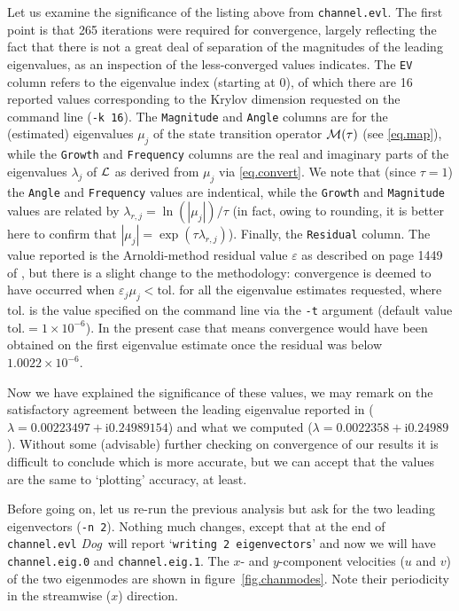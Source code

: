 \documentclass[11pt,a4paper]{report}
\newcommand\ci{\mathrm{i}}
\newcommand\Lop{{\cal L}}
\newcommand\Mop{{\cal M}}
\newcommand{\Dog}{\emph{Dog}}
\begin{document}
Let us examine the significance of the listing above from
\verb+channel.evl+.  The first point is that 265 iterations were
required for convergence, largely reflecting the fact that there is
not a great deal of separation of the magnitudes of the leading
eigenvalues, as an inspection of the less-converged values indicates.
The \verb+EV+ column refers to the eigenvalue index (starting at 0),
of which there are 16 reported values corresponding to the Krylov
dimension requested on the command line (\verb+-k 16+).  The
\verb+Magnitude+ and \verb+Angle+ columns are for the (estimated)
eigenvalues $\mu_j$ of the state transition operator $\Mop(\tau)$ (see
\ref{eq.map}), while the \verb+Growth+ and \verb+Frequency+ columns
are the real and imaginary parts of the eigenvalues $\lambda_j$ of
$\Lop$ as derived from $\mu_j$ via \eqref{eq.convert}.  We note that
(since $\tau=1$) the \verb+Angle+ and \verb+Frequency+ values are
indentical, while the \verb+Growth+ and \verb+Magnitude+ values are
related by $\lambda_{r,j}=\ln(|\mu_j|)/\tau$ (in fact, owing to
rounding, it is better here to confirm that $|\mu_j| =
\exp(\tau\lambda_{r,j})$).  Finally, the \verb+Residual+ column.  The
value reported is the Arnoldi-method residual value $\varepsilon$ as
described on page 1449 of \citet{bbs08b}, but there is a slight change
to the methodology: convergence is deemed to have occurred when
$\varepsilon_j\mu_j<\textrm{tol.}$ for all the eigenvalue estimates
requested, where $\textrm{tol.}$ is the value specified on the command
line via the \verb+-t+ argument (default value
$\textrm{tol.}=1\times10^{-6}$). In the present case that means
convergence would have been obtained on the first eigenvalue estimate
once the residual was below $1.0022\times10^{-6}$.

Now we have explained the significance of these values, we may remark
on the satisfactory agreement between the leading eigenvalue reported
in \citet{chqz88} ($\lambda=0.00223497+\ci 0.24989154$) and what we
computed ($\lambda=0.0022358+\ci 0.24989$). Without some (advisable)
further checking on convergence of our results it is difficult to
conclude which is more accurate, but we can accept that the values are
the same to `plotting' accuracy, at least.

Before going on, let us re-run the previous analysis but ask for the
two leading eigenvectors (\verb+-n 2+).  Nothing much changes, except that
at the end of \verb+channel.evl+ \Dog\ will report `\texttt{writing 2
  eigenvectors}' and now we will have \verb+channel.eig.0+ and
\verb+channel.eig.1+. The $x$- and $y$-component velocities ($u$ and
$v$) of the two eigenmodes are shown in figure~\ref{fig.chanmodes}.
Note their periodicity in the streamwise ($x$) direction.
\end{document}
